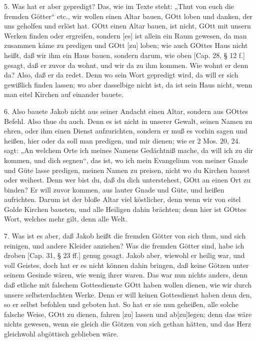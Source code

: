 5. Was hat er aber gepredigt? Das, wie im Texte steht: „Thut von euch die fremden Götter“ etc., wir wollen einen Altar bauen, GOtt loben und danken, der uns geholfen und erlöst hat. GOtt einen Altar bauen, ist nicht, GOtt mit unsern Werken finden oder ergreifen, sondern [es] ist allein ein Raum gewesen, da man zusammen käme zu predigen und GOtt [zu] loben; wie auch GOttes Haus nicht heißt, daß wir ihm ein Haus bauen, sondern darum, wie oben [Cap. 28, § 12 f.] gesagt, daß er zuvor da wohnt, und wir da zu ihm kommen. Wie wohnt er denn da? Also, daß er da redet. Denn wo sein Wort gepredigt wird, da will er sich gewißlich finden lassen; wo aber dasselbige nicht ist, da ist sein Haus nicht, wenn man eitel Kirchen auf einander bauete.

6. Also bauete Jakob nicht aus seiner Andacht einen Altar, sondern aus GOttes Befehl. Also thue du auch. Denn es ist nicht in unserer Gewalt, seinen Namen zu ehren, oder ihm einen Dienst aufzurichten, sondern er muß es vorhin sagen und heißen, hier oder da soll man predigen, und mir dienen; wie er 2 Mos. 20, 24. sagt: „An welchem Orte ich meines Namens Gedächtniß mache, da will ich zu dir kommen, und dich segnen“, das ist, wo ich mein Evangelium von meiner Gnade und Güte lasse predigen, meinen Namen zu preisen, nicht wo du Kirchen bauest oder weihest. Denn wer bist
du, daß du dich unterstehest, GOtt an einen Ort zu binden? Er will zuvor kommen, aus lauter Gnade und Güte, und heißen aufrichten. Darum ist der bloße Altar viel köstlicher, denn wenn wir von eitel Golde Kirchen baueten, und alle Heiligen dahin brächten; denn hier ist GOttes Wort, welches mehr gilt, denn alle Welt.

7. Was ist es aber, daß Jakob heißt die fremden Götter von sich thun, und sich reinigen, und andere Kleider anziehen? Was die fremden Götter sind, habe ich droben [Cap. 31, § 23 ff.] genug gesagt. Jakob aber, wiewohl er heilig war, und voll Geistes, doch hat er es nicht können dahin bringen, daß keine Götzen unter seinem Gesinde wären, wie wenig ihrer waren. Das war nun nichts anders, denn daß etliche mit falschem Gottesdienste GOtt haben wollen dienen, wie wir durch unsere selbsterdachten Werke. Denn er will keinen Gottesdienst haben denn den, so er selbst befohlen und geboten hat. So hat er sie nun geheißen, alle solche falsche Weise, GOtt zu dienen, fahren [zu] lassen und ab[zu]legen; denn das wäre nichts gewesen, wenn sie gleich die Götzen von sich gethan hätten, und das Herz gleichwohl abgöttisch geblieben wäre.

